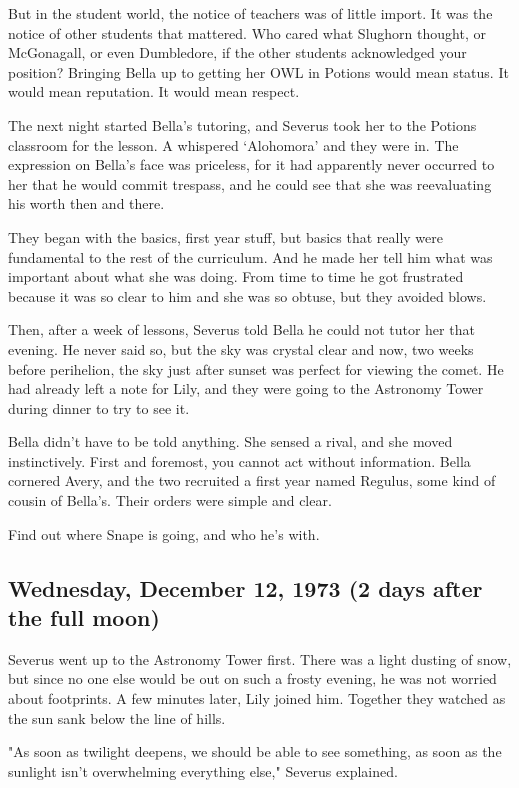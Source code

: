 \documentclass[a4paper,11pt]{article}
\begin{document}
But in the student world, the notice of teachers was of little import. It was the notice of other students that mattered. Who cared what Slughorn thought, or McGonagall, or even Dumbledore, if the other students acknowledged your position? Bringing Bella up to getting her OWL in Potions would mean status. It would mean reputation. It would mean respect.

The next night started Bella's tutoring, and Severus took her to the Potions classroom for the lesson. A whispered `Alohomora' and they were in. The expression on Bella's face was priceless, for it had apparently never occurred to her that he would commit trespass, and he could see that she was reevaluating his worth then and there.

They began with the basics, first year stuff, but basics that really were fundamental to the rest of the curriculum. And he made her tell him what was important about what she was doing. From time to time he got frustrated because it was so clear to him and she was so obtuse, but they avoided blows.

Then, after a week of lessons, Severus told Bella he could not tutor her that evening. He never said so, but the sky was crystal clear and now, two weeks before perihelion, the sky just after sunset was perfect for viewing the comet. He had already left a note for Lily, and they were going to the Astronomy Tower during dinner to try to see it.

Bella didn't have to be told anything. She sensed a rival, and she moved instinctively. First and foremost, you cannot act without information. Bella cornered Avery, and the two recruited a first year named Regulus, some kind of cousin of Bella's. Their orders were simple and clear.

Find out where Snape is going, and who he's with.

\subsection{Wednesday, December 12, 1973 (2 days after the full moon)}

Severus went up to the Astronomy Tower first. There was a light dusting of snow, but since no one else would be out on such a frosty evening, he was not worried about footprints. A few minutes later, Lily joined him. Together they watched as the sun sank below the line of hills.

"As soon as twilight deepens, we should be able to see something, as soon as the sunlight isn't overwhelming everything else," Severus explained.
\end{document}
